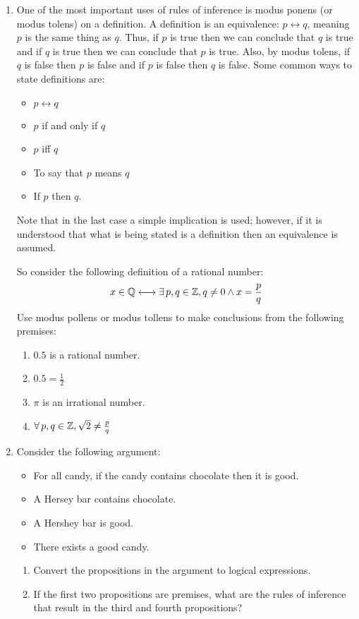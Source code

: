 \documentclass[letterpaper,12pt,fleqn]{article}
\renewcommand{\iff}{\longleftrightarrow}
\begin{document}
\begin{enumerate}[left=0in,itemsep=0.5in]
\item One of the most important uses of rules of inference is modus ponens (or modus tolens) on a definition.  A
  definition is an equivalence: \(p\iff q\), meaning \(p\) is the same thing as \(q\).  Thus, if \(p\) is true then
  we can conclude that \(q\) is true and if \(q\) is true then we can conclude that \(p\) is true.  Also, by modus
  tolens, if \(q\) is false then \(p\) is false and if \(p\) is false then \(q\) is false.  Some common ways to
  state definitions are:
  \begin{itemize}
  \item \(p\iff q\)
  \item \(p\) if and only if \(q\)
  \item \(p\) iff \(q\)
  \item To say that \(p\) means \(q\)
  \item If \(p\) then \(q\).
  \end{itemize}
  Note that in the last case a simple implication is used; however, if it is understood that what is being stated
  is a definition then an equivalence is assumed.

  So consider the following definition of a rational number:
  \[x\in\Q\iff\exists\,p,q\in\Z,q\ne0\land x=\frac{p}{q}\]
  Use modus pollens or modus tollens to make conclusions from the following premises:
  \begin{enumerate}
  \item \(0.5\) is a rational number.
  \item \(0.5=\frac{1}{2}\)
  \item \(\pi\) is an irrational number.
  \item \(\forall\,p,q\in\mathbb{Z},\sqrt{2}\ne\frac{p}{q}\)
  \end{enumerate}

\item Consider the following argument:
  \begin{itemize}
  \item For all candy, if the candy contains chocolate then it is good.
  \item A Hersey bar contains chocolate.
  \item A Hershey bar is good.
  \item There exists a good candy.
  \end{itemize}
  \begin{enumerate}
  \item Convert the propositions in the argument to logical expressions.
  \item If the first two propositions are premises, what are the rules of inference that result in the third and fourth
    propositions?
  \end{enumerate}


\end{enumerate}
\end{document}
